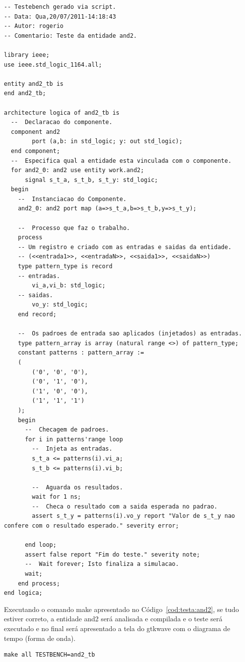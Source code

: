 \documentclass[a4paper,11pt]{report}
\begin{document}
\lstset{language=VHDL}
\lstset{numbers=left, numberstyle=\tiny, stepnumber=1, numbersep=3pt}
\begin{lstlisting}[label=cod:and2_tb,caption=Código VHDL do testebench para entidade and2]
-- Testebench gerado via script.
-- Data: Qua,20/07/2011-14:18:43
-- Autor: rogerio
-- Comentario: Teste da entidade and2.

library ieee;
use ieee.std_logic_1164.all;

entity and2_tb is
end and2_tb;

architecture logica of and2_tb is
  --  Declaracao do componente.
  component and2
    	port (a,b: in std_logic; y: out std_logic);
  end component;
  --  Especifica qual a entidade esta vinculada com o componente.
  for and2_0: and2 use entity work.and2;
      signal s_t_a, s_t_b, s_t_y: std_logic;
  begin
    --  Instanciacao do Componente.
    and2_0: and2 port map (a=>s_t_a,b=>s_t_b,y=>s_t_y);

    --  Processo que faz o trabalho.
    process
	-- Um registro e criado com as entradas e saidas da entidade.
	-- (<<entrada1>>, <<entradaN>>, <<saida1>>, <<saidaN>>)
	type pattern_type is record
	-- entradas.
		vi_a,vi_b: std_logic;
	-- saidas.
		vo_y: std_logic;
	end record;

	--  Os padroes de entrada sao aplicados (injetados) as entradas.
	type pattern_array is array (natural range <>) of pattern_type;
	constant patterns : pattern_array :=
	(
		('0', '0', '0'),
		('0', '1', '0'),
		('1', '0', '0'),
		('1', '1', '1')						
	);
	begin
	  --  Checagem de padroes.
	  for i in patterns'range loop
	    --  Injeta as entradas.
		s_t_a <= patterns(i).vi_a;
		s_t_b <= patterns(i).vi_b;
				
		--  Aguarda os resultados.
		wait for 1 ns;
		--  Checa o resultado com a saida esperada no padrao.
		assert s_t_y = patterns(i).vo_y	report "Valor de s_t_y nao confere com o resultado esperado." severity error;
						
	  end loop;
	  assert false report "Fim do teste." severity note;
	  --  Wait forever; Isto finaliza a simulacao.
	  wait;
	end process;
end logica;
\end{lstlisting}

Executando o comando make apresentado no Código~\ref{cod:testa:and2}, se tudo estiver correto, a entidade and2 será analisada e compilada e o teste será executado e no final será apresentado a tela do gtkwave com o diagrama de tempo (forma de onda).

\lstset{numbers=left, numberstyle=\tiny, stepnumber=1, numbersep=3pt}
\begin{lstlisting}[label=cod:testa:and2,caption=Comando para executar o testbench da entidade and2.]
  make all TESTBENCH=and2_tb
\end{lstlisting}
\end{document}
